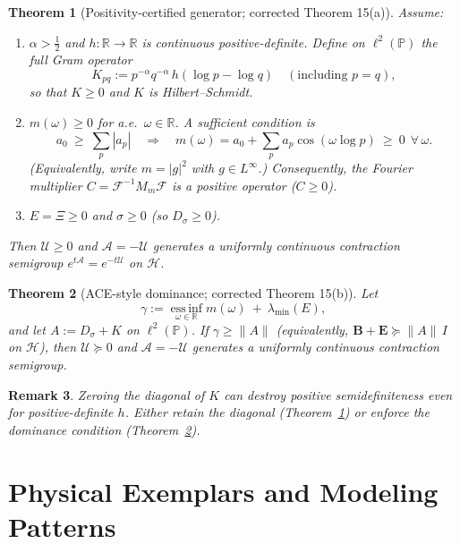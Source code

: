 \documentclass[10pt]{article}
\newtheorem{theorem}{Theorem}
\newtheorem{remark}[theorem]{Remark}
\newcommand{\PP}{\mathbb{P}}
\newcommand{\RR}{\mathbb{R}}
\begin{document}
\begin{theorem}[Positivity-certified generator; corrected Theorem 15(a)]\label{thm:15a}
Assume:
\begin{enumerate}
\item $\alpha>\tfrac12$ and $h:\RR\to\RR$ is continuous positive-definite. Define on $\ell^2(\PP)$ the full Gram operator
\[
K_{pq}:=p^{-\alpha}q^{-\alpha}\,h(\log p-\log q)\quad(\text{including }p=q),
\]
so that $K\ge 0$ and $K$ is Hilbert--Schmidt.
\item $m(\omega)\ge 0$ for a.e.\ $\omega\in\RR$. A sufficient condition is
\[
a_0\ \ge\ \sum_{p}|a_p|
\quad\Longrightarrow\quad
m(\omega)=a_0+\sum_{p}a_p\cos(\omega\log p)\ \ge\ 0\ \ \forall\,\omega.
\]
(Equivalently, write $m=|g|^2$ with $g\in L^\infty$.) \emph{Consequently, the Fourier multiplier}
$C=\mathcal F^{-1}M_m\mathcal F$ \emph{is a positive operator} ($C\ge 0$).
\item $E=\Xi\ge 0$ and $\sigma\ge 0$ (so $D_\sigma\ge 0$).
\end{enumerate}
Then $\mathcal U\ge 0$ and $\mathcal A=-\mathcal U$ generates a uniformly continuous contraction semigroup $e^{t\mathcal A}=e^{-t\mathcal U}$ on $\mathcal H$.
\end{theorem}

\begin{theorem}[ACE-style dominance; corrected Theorem 15(b)]\label{thm:15b}
Let
\[
\gamma := \operatorname*{ess\,inf}_{\omega\in\RR} m(\omega)\ +\ \lambda_{\min}(E),
\]
and let $A:=D_\sigma+K$ on $\ell^2(\PP)$. If $\gamma \ge \|A\|$ (equivalently, $\mathbf B+\mathbf E \succeq \|A\|\,I$ on $\mathcal H$),
then $\mathcal U\succeq 0$ and $\mathcal A=-\mathcal U$ generates a uniformly continuous contraction semigroup.
\end{theorem}

\begin{remark}
Zeroing the diagonal of $K$ can destroy positive semidefiniteness even for positive-definite $h$.
Either retain the diagonal (Theorem~\ref{thm:15a}) or enforce the dominance condition (Theorem~\ref{thm:15b}).
\end{remark}
\section{Physical Exemplars and Modeling Patterns}\label{sec:physical-exemplars}
\end{document}

